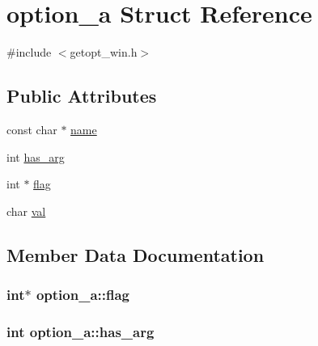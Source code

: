 \hypertarget{structoption__a}{}\section{option\+\_\+a Struct Reference}
\label{structoption__a}


{\ttfamily \#include $<$getopt\+\_\+win.\+h$>$}

\subsection*{Public Attributes}
\begin{DoxyCompactItemize}
\item 
const char $\ast$ \hyperlink{structoption__a_a8ed1ffc9accc9b1699171df984a68748}{name}
\item 
int \hyperlink{structoption__a_abd37d514b9c67c3247d49cb6db5214a6}{has\+\_\+arg}
\item 
int $\ast$ \hyperlink{structoption__a_ab2e4f9c06f5837f5b38a10cf6a90a24d}{flag}
\item 
char \hyperlink{structoption__a_aaf0b246fc9e030806918d01bad91a028}{val}
\end{DoxyCompactItemize}


\subsection{Member Data Documentation}
\hypertarget{structoption__a_ab2e4f9c06f5837f5b38a10cf6a90a24d}{}
\subsubsection[{flag}]{\setlength{\rightskip}{0pt plus 5cm}int$\ast$ option\+\_\+a\+::flag}\label{structoption__a_ab2e4f9c06f5837f5b38a10cf6a90a24d}
\hypertarget{structoption__a_abd37d514b9c67c3247d49cb6db5214a6}{}
\subsubsection[{has\+\_\+arg}]{\setlength{\rightskip}{0pt plus 5cm}int option\+\_\+a\+::has\+\_\+arg}\label{structoption__a_abd37d514b9c67c3247d49cb6db5214a6}
\hypertarget{structoption__a_a8ed1ffc9accc9b1699171df984a68748}{}
